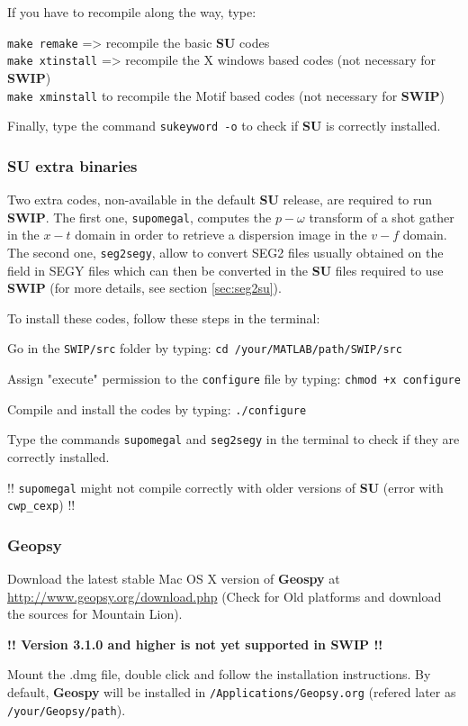 \documentclass[twoside,a4paper]{article}
\def\SWIP{\textbf{SWIP}}
\def\SU{\textbf{SU}}
\def\Geopsy{\textbf{Geospy}}
\begin{document}
If you have to recompile along the way, type:

\verb|make remake| => recompile the basic {\SU} codes\\
\verb|make xtinstall| => recompile the X windows based codes (not necessary for {\SWIP})\\
\verb|make xminstall| to recompile the Motif based codes (not necessary for {\SWIP})

Finally, type the command \verb|sukeyword -o| to check if {\SU} is correctly installed.

\subsubsection{SU extra binaries}
Two extra codes, non-available in the default {\SU} release, are required to run {\SWIP}. The first one, \verb|supomegal|, computes the $p-\omega$ transform of a shot gather in the $x-t$ domain in order to retrieve a dispersion image in the $v-f$ domain. The second one, \verb|seg2segy|, allow to convert SEG2 files usually obtained on the field in SEGY files which can then be converted in the {\SU} files required to use {\SWIP} (for more details, see section \ref{sec:seg2su}).

To install these codes, follow these steps in the terminal:

Go in the \verb|SWIP/src| folder by typing: \verb|cd /your/MATLAB/path/SWIP/src|

Assign "execute" permission to the \verb|configure| file by typing: \verb|chmod +x configure|

Compile and install the codes by typing: \verb|./configure|

Type the commands \verb|supomegal| and \verb|seg2segy| in the terminal to check if they are correctly installed.

!! \verb|supomegal| might not compile correctly with older versions of {\SU} (error with \verb|cwp_cexp|) !!

\subsubsection{Geopsy}
Download the latest stable Mac OS X version of {\Geopsy} at \url{http://www.geopsy.org/download.php} (Check for Old platforms and download the sources for Mountain Lion).

\textbf{!! Version 3.1.0 and higher is not yet supported in SWIP !!}

Mount the .dmg file, double click and follow the installation instructions. By default, {\Geopsy} will be installed in \verb|/Applications/Geopsy.org| (refered later as \verb|/your/Geopsy/path|).
\end{document}
